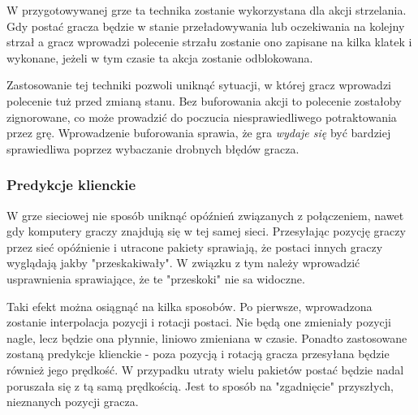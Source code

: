 W przygotowywanej grze ta technika zostanie wykorzystana dla akcji strzelania. Gdy postać gracza będzie w stanie przeładowywania lub oczekiwania na kolejny strzał a gracz wprowadzi polecenie strzału zostanie ono zapisane na kilka klatek i wykonane, jeżeli w tym czasie ta akcja zostanie odblokowana. 

Zastosowanie tej techniki pozwoli uniknąć sytuacji, w której gracz wprowadzi polecenie tuż przed zmianą stanu. Bez buforowania akcji to polecenie zostałoby zignorowane, co może prowadzić do poczucia niesprawiedliwego potraktowania przez grę. Wprowadzenie buforowania sprawia, że gra \emph{wydaje się} być bardziej sprawiedliwa poprzez wybaczanie drobnych błędów gracza.

\subsubsection{Predykcje klienckie}\label{sec:concept_prediction}

W grze sieciowej nie sposób uniknąć opóźnień związanych z połączeniem, nawet gdy komputery graczy znajdują się w tej samej sieci. Przesyłając pozycję graczy przez sieć opóźnienie i utracone pakiety sprawiają, że postaci innych graczy wyglądają jakby "przeskakiwały". W związku z tym należy wprowadzić usprawnienia sprawiające, że te "przeskoki" nie sa widoczne. 

Taki efekt można osiągnąć na kilka sposobów. Po pierwsze, wprowadzona zostanie interpolacja pozycji i rotacji postaci. Nie będą one zmieniały pozycji nagle, lecz będzie ona płynnie, liniowo zmieniana w czasie. Ponadto zastosowane zostaną predykcje klienckie - poza pozycją i rotacją gracza przesyłana będzie również jego prędkość. W przypadku utraty wielu pakietów postać będzie nadal poruszała się z tą samą prędkością. Jest to sposób na "zgadnięcie" przyszłych, nieznanych pozycji gracza.  

